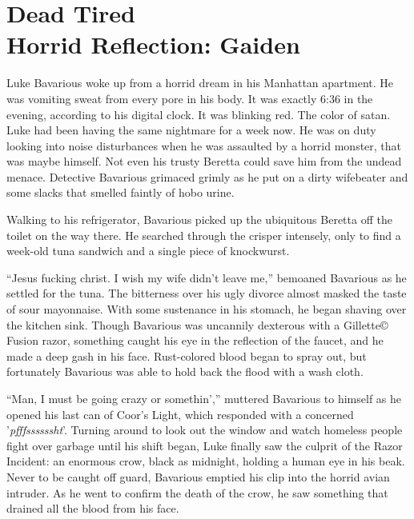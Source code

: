 \chapter[Dead Tired]{Dead Tired\\Horrid Reflection: Gaiden}



Luke Bavarious woke up from a horrid dream in his Manhattan
apartment. He was vomiting sweat from every pore in his body. It
was exactly 6:36 in the evening, according to his digital clock. It
was blinking red. The color of satan. Luke had been having the same
nightmare for a week now. He was on duty looking into noise
disturbances when he was assaulted by a horrid monster, that was
maybe himself. Not even his trusty Beretta could save him from the
undead menace. Detective Bavarious grimaced grimly as he put on a
dirty wifebeater and some slacks that smelled faintly of hobo
urine.



Walking to his refrigerator, Bavarious picked up the ubiquitous
Beretta off the toilet on the way there. He searched through the
crisper intensely, only to find a week-old tuna sandwich and a
single piece of knockwurst.



``Jesus fucking christ. I wish my wife didn't leave me,'' bemoaned
Bavarious as he settled for the tuna. The bitterness over his ugly
divorce almost masked the taste of sour mayonnaise. With some
sustenance in his stomach, he began shaving over the kitchen sink.
Though Bavarious was uncannily dexterous with a Gillette{\copyright}
Fusion razor, something caught his eye in the reflection of the
faucet, and he made a deep gash in his face. Rust-colored blood
began to spray out, but fortunately Bavarious was able to hold back
the flood with a wash cloth.



``Man, I must be going crazy or somethin','' muttered Bavarious to
himself as he opened his last can of Coor's Light, which responded
with a concerned '{\em pfffssssssht}'. Turning around to look out
the window and watch homeless people fight over garbage until his
shift began, Luke finally saw the culprit of the Razor Incident: an
enormous crow, black as midnight, holding a human eye in his beak.
Never to be caught off guard, Bavarious emptied his clip into the
horrid avian intruder. As he went to confirm the death of the crow,
he saw something that drained all the blood from his face.




